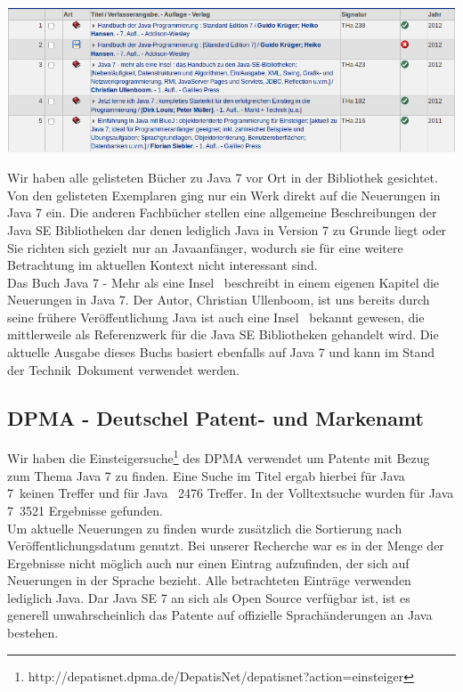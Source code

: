 \begin{center}
\includegraphics[width=\textwidth]{images/dhbw-lib-search-results.png}
\end{center}

Wir haben alle gelisteten Bücher zu Java 7 vor Ort in der Bibliothek gesichtet. Von den gelisteten Exemplaren ging nur ein Werk\cite{javainsel2} direkt auf die Neuerungen in Java 7 ein. Die anderen Fachbücher stellen eine allgemeine Beschreibungen der Java SE Bibliotheken dar denen lediglich Java in Version 7 zu Grunde liegt\cite{dhLibHandbuchJava} oder Sie richten sich gezielt nur an Javaanfänger\cite{dhLibJetztJavaLernen}\cite{dhLibBlueJStart}, wodurch sie für eine weitere Betrachtung im aktuellen Kontext nicht interessant sind.\\

Das Buch \glqq Java 7 - Mehr als eine Insel\grqq\cite{javainsel2} ~beschreibt in einem eigenen Kapitel die Neuerungen in Java 7. Der Autor, Christian Ullenboom, ist uns bereits durch seine frühere Veröffentlichung \glqq Java ist auch eine Insel\grqq\cite{javainsel1} ~bekannt gewesen, die mittlerweile als Referenzwerk für die Java SE Bibliotheken gehandelt wird. Die aktuelle Ausgabe dieses Buchs basiert ebenfalls auf Java 7 und kann im \glqq Stand der Technik\grqq ~Dokument verwendet werden.

\subsection{DPMA - Deutschel Patent- und Markenamt}
Wir haben die Einsteigersuche\footnote{http://depatisnet.dpma.de/DepatisNet/depatisnet?action=einsteiger} des DPMA verwendet um Patente mit Bezug zum Thema Java 7 zu finden. Eine Suche im Titel ergab hierbei für \glqq Java 7\grqq ~keinen Treffer und für \glqq Java \grqq ~2476 Treffer. In der Volltextsuche wurden für \glqq Java 7\grqq ~3521 Ergebnisse gefunden.\\

Um aktuelle Neuerungen zu finden wurde zusätzlich die Sortierung nach Veröffentlichungsdatum genutzt. Bei unserer Recherche war es in der Menge der Ergebnisse nicht möglich auch nur einen Eintrag aufzufinden, der sich auf Neuerungen in der Sprache bezieht. Alle betrachteten Einträge verwenden lediglich Java. Dar Java SE 7 an sich als Open Source verfügbar ist, ist es generell unwahrscheinlich das Patente auf offizielle Sprachänderungen an Java bestehen.\\

